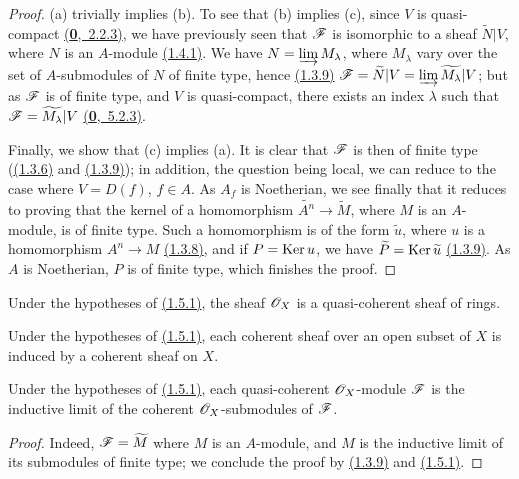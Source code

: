 \begin{proof}
\label{proof-thm-1.1.5.1}
(a) trivially implies (b). To see that (b) implies (c), since $V$ is quasi-compact
\hyperref[env-0.2.2.3]{(\textbf{0},~2.2.3)}, we have previously seen that $\mathscr{F}$ is isomorphic to a
sheaf $\widetilde{N}|V$, where $N$ is an $A$-module \hyperref[thm-1.1.4.1]{(1.4.1)}. We have
$N=\varinjlim M_\lambda$, where $M_\lambda$ vary over the set of $A$-submodules of $N$ of finite type, hence
\hyperref[cor-1.1.3.9]{(1.3.9)} $\mathscr{F}=\widetilde{N}|V=\varinjlim\widetilde{M_\lambda}|V$; but as $\mathscr{F}$
is of finite type, and $V$ is quasi-compact, there exists an index $\lambda$ such that
$\mathscr{F}=\widetilde{M_\lambda}|V$ \hyperref[env-0.5.2.3]{(\textbf{0},~5.2.3)}.

Finally, we show that (c) implies (a). It is clear that $\mathscr{F}$ is then of finite type
(\hyperref[prop-1.1.3.6]{(1.3.6)} and \hyperref[cor-1.1.3.9]{(1.3.9)}); in addition, the question being local, we can
reduce to the case where $V=D(f)$, $f\in A$. As $A_f$ is Noetherian, we see finally that it
reduces to proving that the kernel of a homomorphism $\widetilde{A^n}\to\widetilde{M}$, where
$M$ is an $A$-module, is of finite type. Such a homomorphism is of the form $\widetilde{u}$,
where $u$ is a homomorphism $A^n\to M$ \hyperref[cor-1.1.3.8]{(1.3.8)}, and if $P={\mathop{\mathrm{Ker}}\nolimits}\, u$, we have
$\widetilde{P}={\mathop{\mathrm{Ker}}\nolimits}\,\widetilde{u}$ \hyperref[cor-1.1.3.9]{(1.3.9)}. As $A$ is Noetherian, $P$ is of finite
type, which finishes the proof.
\end{proof}

\begin{cor}[1.5.2]
\label{cor-1.1.5.2}
Under the hypotheses of \hyperref[thm-1.1.5.1]{(1.5.1)}, the sheaf $\mathscr{O}_X$ is a quasi-coherent sheaf of
rings.
\end{cor}

\begin{cor}[1.5.3]
\label{cor-1.1.5.3}
Under the hypotheses of \hyperref[thm-1.1.5.1]{(1.5.1)}, each coherent sheaf over an open subset of $X$ is
induced by a coherent sheaf on $X$.
\end{cor}

\begin{cor}[1.5.4]
\label{cor-1.1.5.4}
Under the hypotheses of \hyperref[thm-1.1.5.1]{(1.5.1)}, each quasi-coherent $\mathscr{O}_X$-module $\mathscr{F}$ is
the inductive limit of the coherent $\mathscr{O}_X$-submodules of $\mathscr{F}$.
\end{cor}

\begin{proof}
\label{proof-cor-1.1.5.4}
Indeed, $\mathscr{F}=\widetilde{M}$ where $M$ is an $A$-module, and $M$ is the inductive limit of
its submodules of finite type; we conclude the proof by \hyperref[cor-1.1.3.9]{(1.3.9)} and
\hyperref[thm-1.1.5.1]{(1.5.1)}.
\end{proof}

